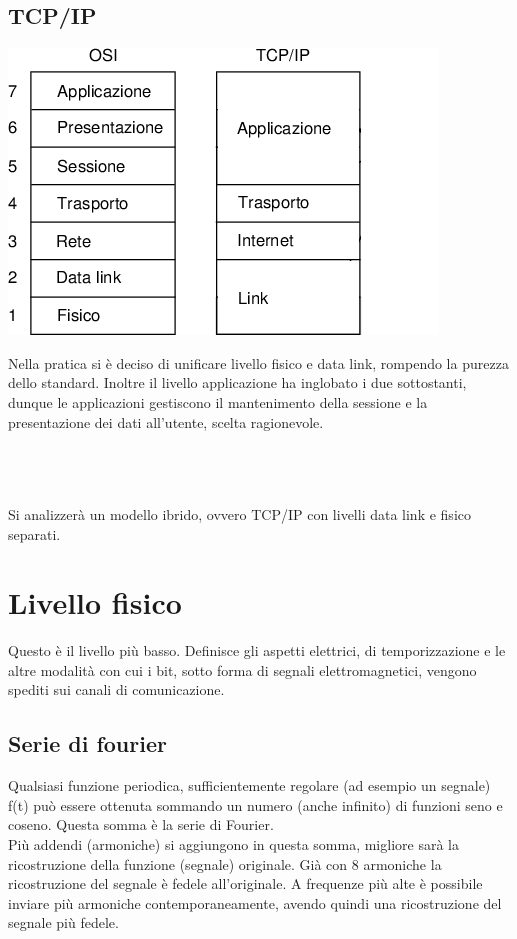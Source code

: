 \documentclass[10pt,a4paper,twoside]{article}
\begin{document}
\subsection*{TCP/IP}
\begin{minipage}{0.4\textwidth}
\includegraphics[width=\textwidth]{images/tcp_ip.png}
\end{minipage}
\begin{minipage}{0.6\textwidth}
Nella pratica si è deciso di unificare livello fisico e data link, rompendo la purezza dello standard. Inoltre il livello applicazione ha inglobato i due sottostanti, dunque le applicazioni gestiscono il mantenimento della sessione e la presentazione dei dati all'utente, scelta ragionevole.
\end{minipage}\\\\\\
Si analizzerà un modello ibrido, ovvero TCP/IP con livelli data link e fisico separati.

\newpage
{}

\section{Livello fisico}
Questo è il livello più basso. Definisce gli aspetti elettrici, di temporizzazione e le altre modalità con cui i bit, sotto forma di segnali elettromagnetici, vengono spediti sui canali di comunicazione.
\subsection{Serie di fourier}
Qualsiasi funzione periodica, sufficientemente regolare (ad esempio un segnale) f(t) può essere ottenuta sommando un numero (anche infinito) di funzioni seno e coseno. Questa somma è la serie di Fourier.\\
Più addendi (armoniche) si aggiungono in questa somma, migliore sarà la ricostruzione della funzione (segnale) originale. Già con 8 armoniche la ricostruzione del segnale è fedele all'originale. A frequenze più alte è possibile inviare più armoniche contemporaneamente, avendo quindi una ricostruzione del segnale più fedele.
\end{document}
